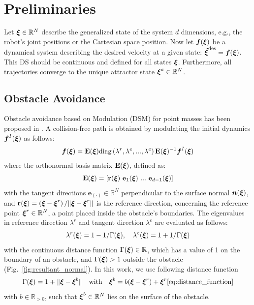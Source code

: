 \section{Preliminaries}
Let $\boldsymbol{\xi} \in \mathbb{R}^N$ describe the generalized state of the system $d$ dimensions, e.g., the robot's joint positions or the Cartesian space position.
Now let $\boldsymbol{f}(\boldsymbol{\xi})$ be a dynamical system describing the desired velocity at a given state: $\boldsymbol{\dot\xi}^{\mathrm{des}} = \boldsymbol{f}( \boldsymbol{\xi})$.
This DS should be continuous and defined for all states $\boldsymbol{\xi}$. Furthermore, all trajectories converge to the unique attractor state $\boldsymbol{\xi} ^a \in \mathbb{R}^N$. 

\subsection{Obstacle Avoidance}
Obstacle avoidance based on Modulation (DSM) for point masses has been proposed in \cite{huber2022avoiding}. A collision-free path is obtained by modulating the initial dynamics $\boldsymbol{f}^I(\boldsymbol{\xi})$ as follows:
\begin{equation}
  \vecs f(\vecs \xi) = \textbf{E}(\vecs \xi) \text{diag} \left(\lambda^r, \lambda^e, ..., \lambda^e \right) \textbf{E}(\vecs{\xi})^{-1} \vect f^I(\vecs \xi)
  \label{eq:modulated} 
\end{equation}
where the orthonormal basis matrix $\textbf{E}(\boldsymbol{\xi})$, defined as:
\begin{equation}
\textbf{E}(\vecs \xi) = \left[ \textbf{r}(\vecs \xi) \ \textbf{e}_1(\vecs \xi) \ ... \ \textbf{e}_{d-1}(\vecs \xi) \right]
\label{eq:matrix_E}
\end{equation}
with the tangent directions $\textbf{e}_{(\cdot)} \in \mathbb{R}^N$ perpendicular to the surface normal $\boldsymbol{n}(\boldsymbol{\xi})$, and $\textbf{r}(\boldsymbol{\xi}) =  \left( \boldsymbol{\xi}-\boldsymbol{\xi}^r \right) / \| \boldsymbol{\xi}-\boldsymbol{\xi} ^r \|$ is the reference direction, concerning the reference point $\boldsymbol{\xi}^r \in \mathbb{R}^N$, a point placed inside the obstacle's boundaries.
The eigenvalues in reference direction  $\lambda^r$ and tangent direction $\lambda^e$ are evaluated as follows:
\begin{equation}
\begin{split}
    \lambda^r(\vecs \xi) = 1 - 1 /\Gamma(\vecs \xi) , \quad \lambda^e(\vecs \xi) = 1 + 1 / \Gamma(\vecs \xi)
    \label{eq:eigenvalues}
    \end{split}
\end{equation}
with the continuous distance function $\Gamma(\boldsymbol{\xi}) \in \mathbb{R}$, which has a value of 1 on the boundary of an obstacle, and $\Gamma(\boldsymbol{\xi}) > 1$ outside the obstacle (Fig.~\ref{fig:resultant_normal}). In this work, we use following distance function
\begin{equation}
  \Gamma(\boldsymbol{\xi}) = 1 + \| \boldsymbol{\xi} - \boldsymbol{\xi}^b \|  
  \quad \text{with} \quad
  \boldsymbol{\xi}^b = b (\boldsymbol{\xi} - \boldsymbol{\xi}^r) + \boldsymbol{\xi}^r
  \eqref{eq:distance_function}
\end{equation}
with $b \in \mathbb{R}_{>0}$, such that $\boldsymbol{\xi}^b \in \mathbb{R}^N$ lies on the surface of the obstacle.

